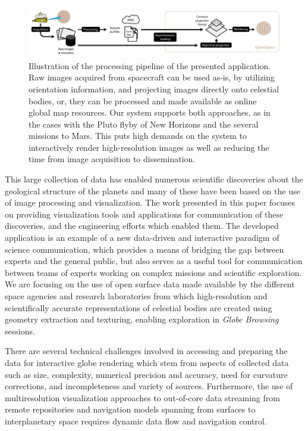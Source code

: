 \documentclass[journal]{vgtc}                %
\begin{document}
\begin{figure}
\includegraphics[width=\linewidth]{figures/overview.pdf}
\caption{Illustration of the processing pipeline of the presented application. Raw images acquired from spacecraft can be used as-is, by utilizing orientation information, and projecting images directly onto celestial bodies, or, they can be processed and made available as online global map resources. Our system supports both approaches, as in the cases with the Pluto flyby of New Horizons and the several missions to Mars. This puts high demands on the system to interactively render high-resolution images as well as reducing the time from image acquisition to dissemination.}\vspace{-3mm}

\label{fig:procpipe}
\end{figure}

This large collection of data has enabled numerous scientific discoveries about the geological structure of the planets and many of these have been based on the use of image processing and visualization.
The work presented in this paper focuses on providing visualization tools and applications for communication of these discoveries, and the engineering efforts which enabled them.
The developed application is an example of a new data-driven and interactive paradigm of science communication, which provides a means of bridging the gap between experts and the general public, but also serves as a useful tool for communication between teams of experts working on complex missions and scientific exploration.
We are focusing on the use of open surface data made available by the different space agencies and research laboratories from which high-resolution and scientifically accurate representations of celestial bodies are created using geometry extraction and texturing, enabling exploration in \emph{Globe Browsing} sessions.

There are several technical challenges involved in accessing and preparing the data for interactive globe rendering which stem from aspects of collected data such as size, complexity, numerical precision and accuracy, need for curvature corrections, and incompleteness and variety of sources.
Furthermore, the use of multiresolution visualization approaches to out-of-core data streaming from remote repositories and navigation models spanning from surfaces to interplanetary space requires dynamic data flow and navigation control. 
\end{document}

